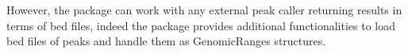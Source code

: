 However, the package can work with any external peak caller returning results in terms of bed files, indeed the package provides additional functionalities to load bed files of peaks and handle them as GenomicRanges \cite{Lawrence2013} structures.
